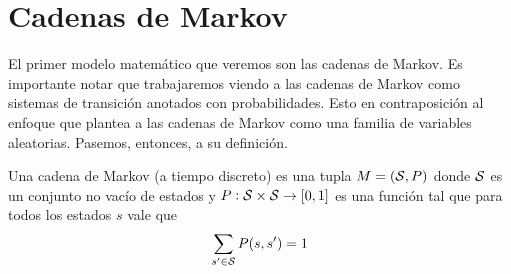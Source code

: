 












\section{Cadenas de Markov}

El primer modelo matemático que veremos son las cadenas de Markov. Es
importante notar que trabajaremos viendo a las cadenas de Markov como sistemas
de transición anotados con probabilidades. Esto en contraposición al enfoque
que plantea a las cadenas de Markov como una familia de variables aleatorias.
Pasemos, entonces, a su definición.

\begin{definition}
	Una cadena de Markov (a tiempo discreto) es una tupla $M = (\mathcal{S}, P)$ donde $\mathcal{S}$ es un conjunto no vacío de estados y $P: \mathcal{S} \times \mathcal{S} \rightarrow [0,1]$ es una función tal que para todos los estados $s$ vale que
	$$ \sum_{s' \in \mathcal{S}} P(s, s') = 1$$
\end{definition}

